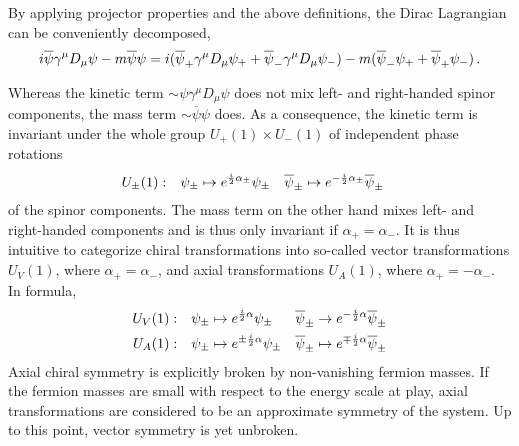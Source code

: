 By applying projector properties and the above definitions, the Dirac Lagrangian can be conveniently decomposed,
\begin{equation}
    {i}\overline{\psi}\gamma^\mu D_\mu\psi-m\overline{\psi}\psi={i}(\overline{\psi}_+\gamma^\mu D_\mu\psi_++\overline{\psi}_-\gamma^\mu D_\mu\psi_-)-m(\overline{\psi}_-\psi_++\overline{\psi}_+\psi_-)\,.
\end{equation}

Whereas the kinetic term ${\sim\psi\gamma^\mu D_\mu\psi}$ does not mix left- and right-handed spinor components, the mass term ${\sim\overline{\psi}\psi}$ does. As a consequence, the kinetic term is invariant under the whole group ${U_+(1)\times U_-(1)}$ of independent phase rotations
\begin{align}
        &&U_\pm(1)  :&& \psi_\pm&\mapsto e^{\frac{{i}}{2}\alpha_\pm}\psi_\pm&\overline{\psi}_\pm&\mapsto e^{-\frac{{i}}{2}\alpha_\pm}\overline{\psi}_\pm&&
\end{align}
of the spinor components. The mass term on the other hand mixes left- and right-handed components and is thus only invariant if ${\alpha_+=\alpha_-}$. It is thus intuitive to categorize chiral transformations into so-called vector transformations ${U_V(1)}$, where ${\alpha_+=\alpha_-}$, and axial transformations ${U_A(1)}$, where ${\alpha_+=-\alpha_-}$. In formula,
\begin{subequations}
    \begin{align}
        &&U_V(1) : & &\psi_\pm&\mapsto e^{\frac{{i}}{2}\alpha}\psi_\pm &\overline{\psi}_\pm&\to e^{-\frac{{i}}{2}\alpha}\overline{\psi}_\pm      &&\\
        &&U_A(1) : & &\psi_\pm&\mapsto e^{\pm\frac{{i}}{2}\alpha}\psi_\pm &\overline{\psi}_\pm&\mapsto e^{\mp\frac{{i}}{2}\alpha}\overline{\psi}_\pm&&
    \end{align}
\end{subequations}
Axial chiral symmetry is explicitly broken by non-vanishing fermion masses. If the fermion masses are small with respect to the energy scale at play, axial transformations are considered to be an approximate symmetry of the system. Up to this point, vector symmetry is yet unbroken.

